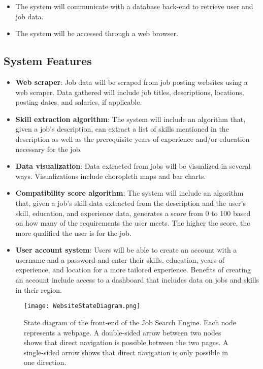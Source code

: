 \documentclass[titlepage]{article}
\begin{document}
\begin{itemize}
    \item The system will communicate with a database back-end to retrieve user and job data.
    \item The system will be accessed through a web browser.
\end{itemize}

\subsection{System Features}

\begin{itemize}
    \item \textbf{Web scraper}: Job data will be scraped from job posting websites using a web scraper. Data gathered will include job titles, descriptions, locations, posting dates, and salaries, if applicable.
    \item \textbf{Skill extraction algorithm}: The system will include an algorithm that, given a job's description, can extract a list of skills mentioned in the description as well as the prerequisite years of experience and/or education necessary for the job.
    \item \textbf{Data visualization}: Data extracted from jobs will be visualized in several ways. Visualizations include choropleth maps and bar charts.
    \item \textbf{Compatibility score algorithm}: The system will include an algorithm that, given a job's skill data extracted from the description and the user's skill, education, and experience data, generates a score from 0 to 100 based on how many of the requirements the user meets. The higher the score, the more qualified the user is for the job.
    \item \textbf{User account system}: Users will be able to create an account with a username and a password and enter their skills, education, years of experience, and location for a more tailored experience. Benefits of creating an account include access to a dashboard that includes data on jobs and skills in their region.
\end{itemize}

\begin{figure}
    \centering
    \texttt{[image: WebsiteStateDiagram.png]}
    \caption{State diagram of the front-end of the Job Search Engine. Each node represents a webpage. A double-sided arrow between two nodes shows that direct navigation is possible between the two pages. A single-sided arrow shows that direct navigation is only possible in one direction.}
    \label{fig:state_diagram}
\end{figure}
\end{document}
